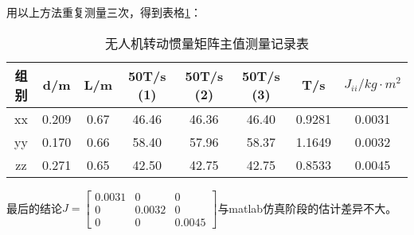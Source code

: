 用以上方法重复测量三次，得到表格\ref{三次}：
  
  \begin{table}
    \centering
    \begin{tabular}{cccccccc}
        \toprule
        组别&d/m  & L/m & 50T/s (1) & 50T/s (2) &50T/s (3) & T/s & $J_{ii} / kg \cdot m^2$\\
        \midrule
        xx& 0.209 &0.67 & 46.46 & 46.36 & 46.40 &0.9281 &0.0031\\
        yy& 0.170 &0.66 & 58.40 & 57.96 & 58.37 &1.1649 &0.0032\\
        zz& 0.271 & 0.65& 42.50 & 42.75 & 42.75 &0.8533 &0.0045\\
        \bottomrule
    \end{tabular}
    \caption{无人机转动惯量矩阵主值测量记录表}
    \label{三次}
\end{table}

最后的结论$J=\begin{bmatrix}
  0.0031 &0&0\\
  0&0.0032&0\\
  0&0& 0.0045
\end{bmatrix}$与matlab仿真阶段的估计差异不大。